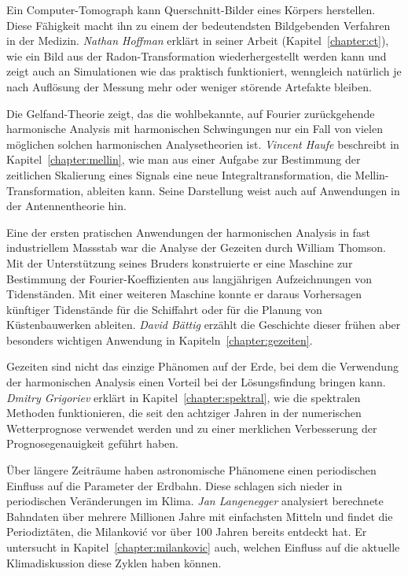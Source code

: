 Ein Computer-Tomograph kann Querschnitt-Bilder eines Körpers
herstellen.
Diese Fähigkeit macht ihn zu einem der bedeutendsten Bildgebenden
Verfahren in der Medizin.
{\em Nathan Hoffman} erklärt in seiner Arbeit (Kapitel~\ref{chapter:ct}),
wie ein Bild aus der
Radon-Transformation wiederhergestellt werden kann und zeigt auch
an Simulationen wie das praktisch funktioniert, wenngleich natürlich
je nach Auflösung der Messung mehr oder weniger störende Artefakte bleiben.

Die Gelfand-Theorie zeigt, das die wohlbekannte, auf Fourier zurückgehende
harmonische Analysis mit harmonischen Schwingungen nur ein Fall von vielen
möglichen solchen harmonischen Analysetheorien ist.
{\em Vincent Haufe} beschreibt in Kapitel~\ref{chapter:mellin},
wie man aus einer Aufgabe
zur Bestimmung der zeitlichen Skalierung eines Signals eine
neue Integraltransformation, die Mellin-Transformation, ableiten 
kann.
Seine Darstellung weist auch auf Anwendungen in der Antennentheorie
hin.

Eine der ersten pratischen Anwendungen der harmonischen Analysis in
fast industriellem Massstab war die Analyse der Gezeiten durch
William Thomson.
Mit der Unterstützung seines Bruders konstruierte er eine Maschine zur
Bestimmung der Fourier-Koeffizienten aus langjährigen Aufzeichnungen
von Tidenständen.
Mit einer weiteren Maschine konnte er daraus Vorhersagen künftiger
Tidenstände für die Schiffahrt oder für die Planung von Küstenbauwerken
ableiten.
{\em David Bättig} erzählt die Geschichte dieser frühen aber besonders
wichtigen Anwendung in Kapiteln~\ref{chapter:gezeiten}.

Gezeiten sind nicht das einzige Phänomen auf der Erde, bei dem die
Verwendung der harmonischen Analysis einen Vorteil bei der Lösungsfindung
bringen kann.
{\em Dmitry Grigoriev} erklärt in Kapitel~\ref{chapter:spektral},
wie die spektralen Methoden funktionieren, die seit den achtziger Jahren
in der numerischen Wetterprognose verwendet werden und zu einer
merklichen Verbesserung der Prognosegenauigkeit geführt haben.

Über längere Zeiträume haben astronomische Phänomene einen periodischen
Einfluss auf die Parameter der Erdbahn.
Diese schlagen sich nieder in periodischen Veränderungen im Klima.
{\em Jan Langenegger} analysiert berechnete Bahndaten über mehrere
Millionen Jahre mit einfachsten Mitteln und findet die Periodiztäten,
die Milankovi\'c vor über 100 Jahren bereits entdeckt hat.
Er untersucht in Kapitel~\ref{chapter:milankovic} auch, welchen Einfluss
auf die aktuelle Klimadiskussion diese Zyklen haben können.

